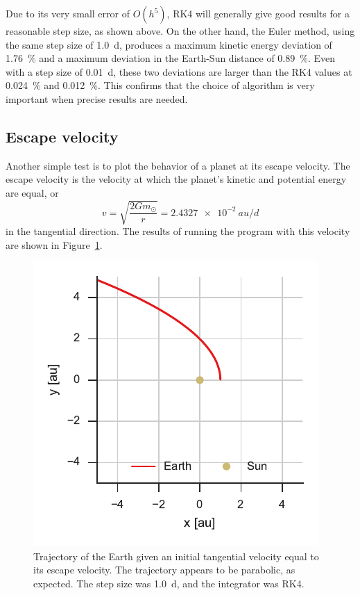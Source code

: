 \documentclass[aps,prc,reprint,nobalancelastpage]{revtex4-1}
\newcommand{\sun}[0]{\ensuremath{\odot}}
\begin{document}
        Due to its very small error of $O(h^5)$, RK4 will generally give good results for a reasonable step size, as shown above. On the other hand, the Euler method, using the same step size of \SI{1.0}{d}, produces a maximum kinetic energy deviation of \SI{1.76}{\percent} and a maximum deviation in the Earth-Sun distance of \SI{0.89}{\percent}. Even with a step size of \SI{0.01}{d}, these two deviations are larger than the RK4 values at \SI{0.024}{\percent} and \SI{0.012}{\percent}. This confirms that the choice of algorithm is very important when precise results are needed.

    \subsection{Escape velocity}
    \label{sub:escape}

        Another simple test is to plot the behavior of a planet at its escape velocity. The escape velocity is the velocity at which the planet's kinetic and potential energy are equal, or
        \begin{equation}
            v = \sqrt{\frac{2Gm_\sun}{r}} = \SI{2.4327e-2}{au/d}
        \end{equation}
        in the tangential direction. The results of running the program with this velocity are shown in Figure~\ref{fig:escape}.

        \begin{figure}
            \includegraphics{escape.pdf}
            \caption{Trajectory of the Earth given an initial tangential velocity equal to its escape velocity. The trajectory appears to be parabolic, as expected. The step size was \SI{1.0}{d}, and the integrator was RK4.}
            \label{fig:escape}
        \end{figure}
\end{document}
